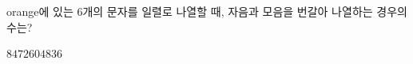 orange에 있는 6개의 문자를 일렬로 나열할 때, 자음과 모음을 번갈아 나열하는 경우의 수는?
\begin{choices32}{$84$}{$72$}{$60$}{$48$}{$36$}\end{choices32}
